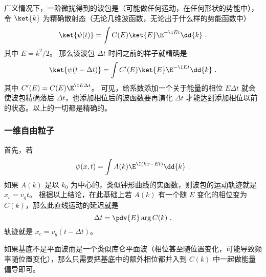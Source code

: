 
\begin{issues}
\issueDraft
\end{issues}

广义情况下，一阶微扰得到的波包是（可能做任何运动，在任何形状的势能中）， 令 $\ket{k}$ 为精确散射态（无论几维波函数，无论出于什么样的势能函数中）
\begin{equation}
\ket{\psi(t)} = \int C(E)\ket{E}\E^{-\I Et}\dd{k}~.
\end{equation}
其中 $E = k^2/2$。 那么该波包 $\Delta t$ 时间之前的样子就精确是
\begin{equation}
\ket{\psi(t-\Delta t)} = \int C'(E)\ket{E}\E^{-\I Et}\dd{k}~.
\end{equation}
其中 $C'(E) = C(E)\E^{\I E \Delta t}$。 可见，给系数添加一个关于能量的相位 $E \Delta t$ 就会使波包精确落后 $\Delta t$，也添加相位后的波函数要再演化 $\Delta t$ 才能达到添加相位以前的状态。以上的一切都是精确的。

\subsubsection{一维自由粒子}
首先，若
\begin{equation}
\psi(x,t) = \int A(k)\E^{\I (kx-Et)} \dd{k}~.
\end{equation}
如果 $A(k)$ 是以 $k_0$ 为中心的，类似钟形曲线的实函数，则波包的运动轨迹就是 $x_c = v_g t$。 根据以上结论，在此基础上若 $A(k)$ 有一个随 $E$ 变化的相位变为 $C(k)$，那么此直线运动的延迟就是
\begin{equation}
\Delta t = \pdv{E} \arg C(k)~.
\end{equation}
轨迹就是 $x_c = v_g (t-\Delta t)$。

如果基底不是平面波而是一个类似库仑平面波（相位甚至随位置变化，可能导致频率随位置变化），那么只需要把基底中的额外相位都并入到 $C(k)$ 中一起做能量偏导即可。

